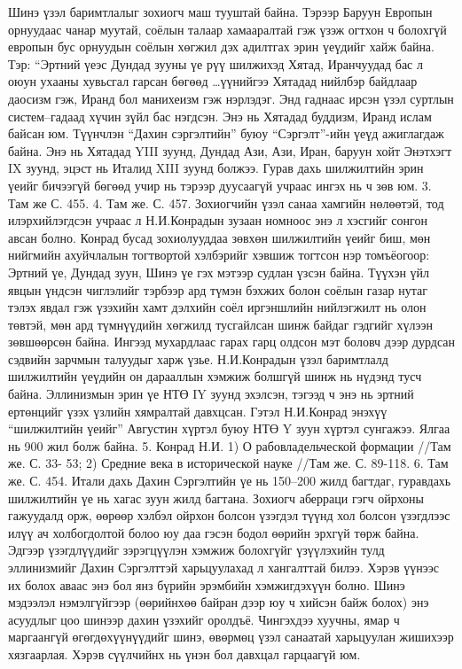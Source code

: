 Шинэ үзэл баримтлалыг зохиогч маш тууштай байна. Тэрээр Баруун Европын орнуудаас чанар муутай, соёлын талаар хамааралтай гэж үзэж огтхон ч болохгүй европын бус орнуудын соёлын хөгжил дэх адилтгах эрин үеүдийг хайж байна. Тэр: “Эртний үеэс Дундад зууны үе рүү шилжихэд Хятад, Иранчуудад бас л оюун ухааны хувьсгал гарсан бөгөөд …үүнийгээ Хятадад нийлбэр байдлаар даосизм гэж, Иранд бол манихеизм гэж нэрлэдэг. Энд гаднаас ирсэн үзэл суртлын систем–гадаад хүчин зүйл бас нэгдсэн. Энэ нь Хятадад буддизм, Иранд ислам байсан юм. Түүнчлэн “Дахин сэргэлтийн” буюу “Сэргэлт”-ийн үеүд ажиглагдаж байна. Энэ нь Хятадад YIII зуунд, Дундад Ази, Ази, Иран, баруун хойт Энэтхэгт IX зуунд, эцэст нь Италид XIII зуунд болжээ. Гурав дахь шилжилтийн эрин үеийг бичээгүй бөгөөд учир нь тэрээр дуусаагүй учраас ингэх нь ч зөв юм. 3. Там же С. 455. 4. Там же. С. 457.
Зохиогчийн үзэл санаа хамгийн нөлөөтэй, тод илэрхийлэгдсэн учраас л Н.И.Конрадын зузаан номноос энэ л хэсгийг сонгон авсан болно. Конрад бусад зохиолууддаа зөвхөн шилжилтийн үеийг биш, мөн нийгмийн ахуйчлалын тогтвортой хэлбэрийг хэвшиж тогтсон нэр томъёогоор: Эртний үе, Дундад зуун, Шинэ үе гэх мэтээр судлан үзсэн байна. Түүхэн үйл явцын үндсэн чиглэлийг тэрбээр ард түмэн бэхжих болон соёлын газар нутаг тэлэх явдал гэж үзэхийн хамт дэлхийн соёл иргэншлийн нийлэгжилт нь олон төвтэй, мөн ард түмнүүдийн хөгжилд тусгайлсан шинж байдаг гэдгийг хүлээн зөвшөөрсөн байна. Ингээд мухардлаас гарах гарц олдсон мэт боловч дээр дурдсан сэдвийн зарчмын талуудыг харж үзье.
Н.И.Конрадын үзэл баримтлалд шилжилтийн үеүдийн он дарааллын хэмжиж болшгүй шинж нь нүдэнд тусч байна. Эллинизмын эрин үе НТӨ IY зуунд эхэлсэн, тэгээд ч энэ нь эртний ертөнцийг үзэх үзлийн хямралтай давхцсан. Гэтэл Н.И.Конрад энэхүү “шилжилтийн үеийг” Августин хүртэл буюу НТӨ Y зуун хүртэл сунгажээ. Ялгаа нь 900 жил болж байна. 5. Конрад Н.И. 1) О рабовладельческой формации //Там же. С. 33- 53; 2) Средние века в исторической науке //Там же. С. 89-118. 6. Там же. С. 454.
Итали дахь Дахин Сэргэлтийн үе нь 150–200 жилд багтдаг, гуравдахь шилжилтийн үе нь хагас зуун жилд багтана. Зохиогч аберраци гэгч ойрхоны гажуудалд орж, өөрөөр хэлбэл ойрхон болсон үзэгдэл түүнд хол болсон үзэгдлээс илүү ач холбогдолтой болоо юу даа гэсэн бодол өөрийн эрхгүй төрж байна. Эдгээр үзэгдлүүдийг зэрэгцүүлэн хэмжиж болохгүйг үзүүлэхийн тулд эллинизмийг Дахин Сэргэлттэй харьцуулахад л хангалттай билээ. Хэрэв үүнээс их болох аваас энэ бол янз бүрийн эрэмбийн хэмжигдэхүүн болно. Шинэ мэдээлэл нэмэлгүйгээр (өөрийнхөө байран дээр юу ч хийсэн байж болох) энэ асуудлыг цоо шинээр дахин үзэхийг оролдъё. Чингэхдээ хуучны, ямар ч маргаангүй өгөгдөхүүнүүдийг шинэ, өвөрмөц үзэл санаатай харьцуулан жишихээр хязгаарлая. Хэрэв сүүлчийнх нь үнэн бол давхцал гарцаагүй юм.
